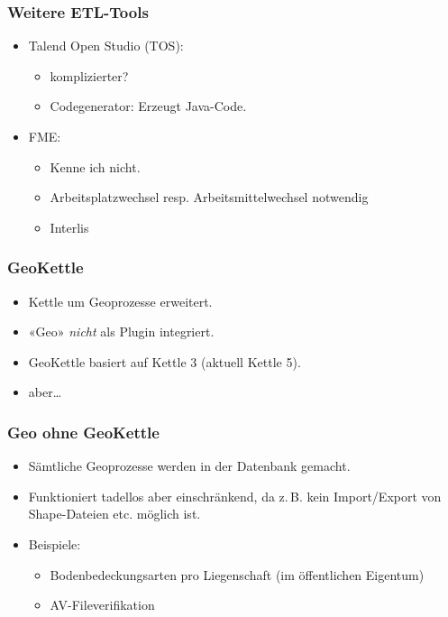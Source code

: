 \documentclass{beamer}
\begin{document}
\begin{frame}
  \frametitle{Weitere ETL-Tools}
  \begin{itemize}
  \item Talend Open Studio (TOS):
	  \begin{itemize}
	  \item komplizierter?
	  \item Codegenerator: Erzeugt Java-Code.
	  \end{itemize}
  \item FME:
	  \begin{itemize}
	  \item Kenne ich nicht.
	  \item Arbeitsplatzwechsel resp. Arbeitsmittelwechsel notwendig \frownie{} 
	  \item Interlis \smiley{} 
	  \end{itemize}

  \end{itemize}
\end{frame}


\begin{frame}
  \frametitle{GeoKettle}
  \begin{itemize}
  \item Kettle um Geoprozesse erweitert.
  \item «Geo» \textsl{nicht} als Plugin integriert.
  \item GeoKettle basiert auf Kettle 3 (aktuell Kettle 5).
  \item aber\ldots{}
  \end{itemize}
\end{frame}

\begin{frame}
  \frametitle{Geo ohne GeoKettle}
  \begin{itemize}
  \item Sämtliche Geoprozesse werden in der Datenbank gemacht.
  \item Funktioniert tadellos aber einschränkend, da z.\,B. kein Import/Export von Shape-Dateien etc. möglich ist.
  \item Beispiele:
  \begin{itemize}
   \item Bodenbedeckungsarten pro Liegenschaft (im öffentlichen Eigentum)
   \item AV-Fileverifikation
  \end{itemize}
 \end{itemize}
\end{frame}
\end{document}
